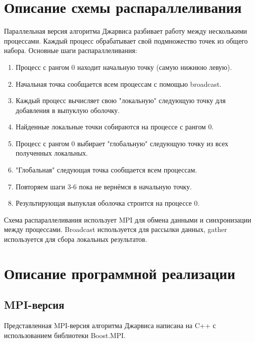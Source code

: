 \documentclass[12pt]{article}
\begin{document}
\section{Описание схемы распараллеливания}
Параллельная версия алгоритма Джарвиса разбивает работу между несколькими процессами. Каждый процесс обрабатывает свой подмножество точек из общего набора. Основные шаги распараллеливания:
\begin{enumerate}
    \item Процесс с рангом 0 находит начальную точку (самую нижнюю левую).
    \item Начальная точка сообщается всем процессам с помощью broadcast.
    \item  Каждый процесс вычисляет свою "локальную" следующую точку для добавления в выпуклую оболочку.
    \item  Найденные локальные точки собираются на процессе с рангом 0.
    \item Процесс с рангом 0 выбирает "глобальную" следующую точку из всех полученных локальных.
    \item "Глобальная" следующая точка сообщается всем процессам.
     \item Повторяем шаги 3-6 пока не вернёмся в начальную точку.
    \item Результирующая выпуклая оболочка строится на процессе 0.
\end{enumerate}
Схема распараллеливания использует MPI для обмена данными и синхронизации между процессами. Broadcast используется для рассылки данных, gather используется для сбора локальных результатов.

\section{Описание программной реализации}

\subsection{MPI-версия}

Представленная MPI-версия алгоритма Джарвиса написана на C++ с использованием библиотеки Boost.MPI.  
\end{document}
